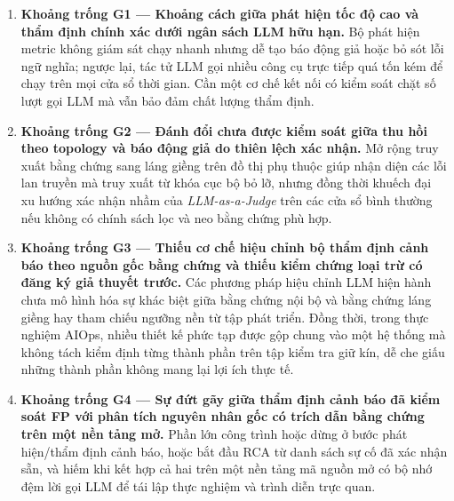 \begin{enumerate}
  \item \textbf{Khoảng trống G1 — Khoảng cách giữa phát hiện tốc độ cao và thẩm định chính xác dưới ngân sách LLM hữu hạn.} Bộ phát hiện metric không giám sát chạy nhanh nhưng dễ tạo báo động giả hoặc bỏ sót lỗi ngữ nghĩa; ngược lại, tác tử LLM gọi nhiều công cụ trực tiếp quá tốn kém để chạy trên mọi cửa sổ thời gian. Cần một cơ chế kết nối có kiểm soát chặt số lượt gọi LLM mà vẫn bảo đảm chất lượng thẩm định.
  \item \textbf{Khoảng trống G2 — Đánh đổi chưa được kiểm soát giữa thu hồi theo topology và báo động giả do thiên lệch xác nhận.} Mở rộng truy xuất bằng chứng sang láng giềng trên đồ thị phụ thuộc giúp nhận diện các lỗi lan truyền mà truy xuất từ khóa cục bộ bỏ lỡ, nhưng đồng thời khuếch đại xu hướng xác nhận nhầm của \emph{LLM-as-a-Judge} trên các cửa sổ bình thường nếu không có chính sách lọc và neo bằng chứng phù hợp.
  \item \textbf{Khoảng trống G3 — Thiếu cơ chế hiệu chỉnh bộ thẩm định cảnh báo theo nguồn gốc bằng chứng và thiếu kiểm chứng loại trừ có đăng ký giả thuyết trước.} Các phương pháp hiệu chỉnh LLM hiện hành chưa mô hình hóa sự khác biệt giữa bằng chứng nội bộ và bằng chứng láng giềng hay tham chiếu ngưỡng nền từ tập phát triển. Đồng thời, trong thực nghiệm AIOps, nhiều thiết kế phức tạp được gộp chung vào một hệ thống mà không tách kiểm định từng thành phần trên tập kiểm tra giữ kín, dễ che giấu những thành phần không mang lại lợi ích thực tế.
  \item \textbf{Khoảng trống G4 — Sự đứt gãy giữa thẩm định cảnh báo đã kiểm soát FP với phân tích nguyên nhân gốc có trích dẫn bằng chứng trên một nền tảng mở.} Phần lớn công trình hoặc dừng ở bước phát hiện/thẩm định cảnh báo, hoặc bắt đầu RCA từ danh sách sự cố đã xác nhận sẵn, và hiếm khi kết hợp cả hai trên một nền tảng mã nguồn mở có bộ nhớ đệm lời gọi LLM để tái lập thực nghiệm và trình diễn trực quan.
\end{enumerate}

